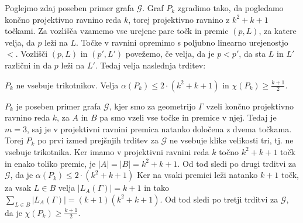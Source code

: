 \documentclass[mat1, tisk]{fmfdelo}
\begin{document}
Poglejmo zdaj poseben primer grafa $\mathcal{G}$. Graf $P_k$ zgradimo tako, da pogledamo končno projektivno ravnino reda $k$, torej projektivno ravnino z $k^2 + k + 1$ točkami. Za vozlišča vzamemo vse urejene pare točk in premic $(p, L)$, za katere velja,
da $p$ leži na $L$. Točke v ravnini opremimo s poljubno linearno urejenostjo $<$. Vozlišči $(p, L)$ in $(p', L')$ povežemo, če velja, da je $p < p'$, da sta $L$ in $L'$ različni in da $p$ leži na $L'$. 
Tedaj velja naslednja trditev:

    \begin{trditev}
        $P_k$ ne vsebuje trikotnikov. Velja $\alpha(P_k) \leq 2 \cdot (k^2 + k + 1)$ in $\chi(P_k) \geq \frac{k + 1}{2}$.
    \end{trditev}

    \begin{dokaz}
        $P_k$ je poseben primer grafa $\mathcal{G}$, kjer smo za geometrijo $\Gamma$ vzeli končno projektivno ravnino reda $k$, za $A$ in $B$ pa smo vzeli vse točke in premice v njej. Tedaj je $m = 3$, saj je v projektivni
        ravnini premica natanko določena z dvema točkama. Torej $P_k$ po prvi izmed prejšnjih trditev za $\mathcal{G}$ ne vsebuje klike velikosti tri, tj. ne vsebuje trikotnika. Ker imamo v projektivni ravnini reda 
        $k$ točno $k^2 + k + 1$ točk in enako toliko premic, je $|A| = |B| = k^2 + k + 1$. Od tod sledi po drugi trditvi za $\mathcal{G}$, da je $\alpha(P_k) \leq 2 \cdot (k^2 + k + 1)$ Ker na vsaki premici leži natanko 
        $k + 1$ točk, za vsak $L \in B$ velja $|L_A(\Gamma)| = k + 1$ in tako $\sum_{L \in B}|L_A(\Gamma)| = (k + 1)(k^2 + k +1)$. Od tod sledi po tretji trditvi za $\mathcal{G}$, da je $\chi(P_k) \geq \frac{k + 1}{2}$.
    \end{dokaz}



    
\end{document}
